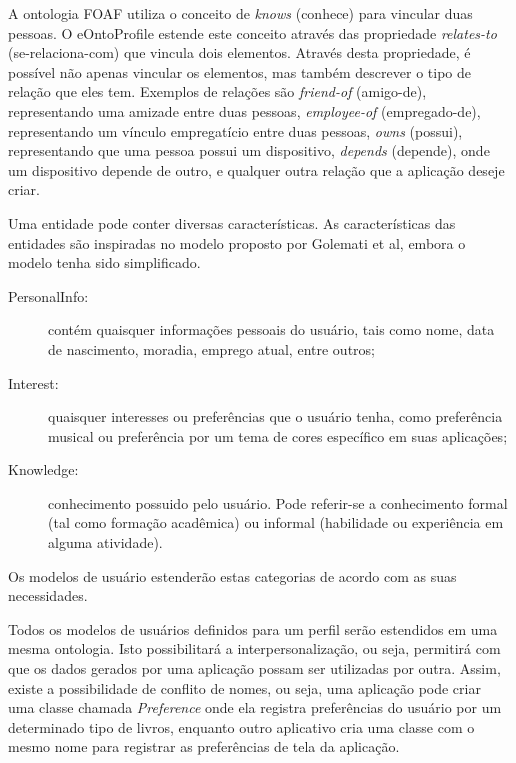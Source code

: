 A ontologia FOAF\cite{foaf} utiliza o conceito de {\em knows} (conhece) para vincular duas pessoas. O eOntoProfile estende este conceito através das propriedade {\em relates-to} (se-relaciona-com) que vincula dois elementos. Através desta propriedade, é possível não apenas vincular os elementos, mas também descrever o tipo de relação que eles tem. Exemplos de relações são {\em friend-of} (amigo-de), representando uma amizade entre duas pessoas, {\em employee-of} (empregado-de), representando um vínculo empregatício entre duas pessoas, {\em owns} (possui), representando que uma pessoa possui um dispositivo, {\em depends} (depende), onde um dispositivo depende de outro, e qualquer outra relação que a aplicação deseje criar.

Uma entidade pode conter diversas características. As características das entidades são inspiradas no modelo proposto por Golemati et al\cite{golemati07}, embora o modelo tenha sido simplificado. 
 
\begin{description}

  \item[PersonalInfo:] contém quaisquer informações pessoais do usuário, tais como nome, data de nascimento, moradia, emprego atual, entre outros;

  \item[Interest:] quaisquer interesses ou preferências que o usuário tenha, como preferência musical ou preferência por um tema de cores específico em suas aplicações;

  \item[Knowledge:] conhecimento possuido pelo usuário. Pode referir-se a conhecimento formal (tal como formação acadêmica) ou informal (habilidade ou experiência em alguma atividade).

\end{description}

Os modelos de usuário estenderão estas categorias de acordo com as suas necessidades.

Todos os modelos de usuários definidos para um perfil serão estendidos em uma mesma ontologia. Isto possibilitará a interpersonalização, ou seja, permitirá com que os dados gerados por uma aplicação possam ser utilizadas por outra. Assim, existe a possibilidade de conflito de nomes, ou seja, uma aplicação pode criar uma classe chamada {\em Preference} onde ela registra preferências do usuário por um determinado tipo de livros, enquanto outro aplicativo cria uma classe com o mesmo nome para registrar as preferências de tela da aplicação.

